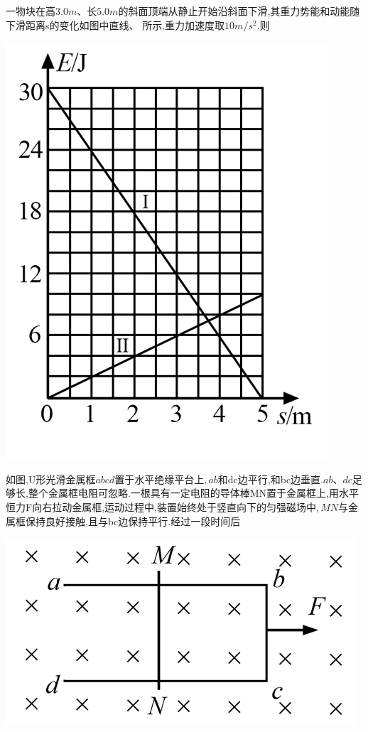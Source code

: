 \newpage
\question[6]一物块在高$3.0m$、长$5.0m$的斜面顶端从静止开始沿斜面下滑,其重力势能和动能随下滑距离s的变化如图中直线\uppercase\expandafter{}、\uppercase\expandafter{ }所示,重力加速度取$10m/s^2.$则
\begin{center}
\includegraphics[]{img/image8.png}
\end{center}

\begin{solution}{4cm}

\end{solution}



\question[6]如图,U形光滑金属框$abcd$置于水平绝缘平台上$,ab$和dc边平行,和bc边垂直$.ab$、$dc$足够长,整个金属框电阻可忽略.一根具有一定电阻的导体棒MN置于金属框上,用水平恒力F向右拉动金属框,运动过程中,装置始终处于竖直向下的匀强磁场中$,MN$与金属框保持良好接触,且与bc边保持平行.经过一段时间后
\begin{center}
\includegraphics[]{img/image9.png}
\end{center}

